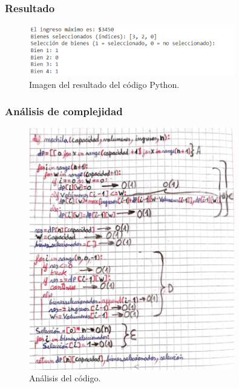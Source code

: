 \subsubsection{Resultado}
\begin{figure}[H]
    \centering
    \includegraphics[width=0.8\textwidth]{resultado_mochila_ejem2.png}
    \caption{Imagen del resultado del código Python.}
    \label{fig:resultado_ejemplo2}
\end{figure}

\subsubsection{Análisis de complejidad}
\begin{figure}[H]
    \centering
    \includegraphics[width=0.8\textwidth]{complejidad_mochila_ejem2.png}
    \caption{Análisis del código.}
    \label{fig:complejidad_ejemplo2}
\end{figure}

